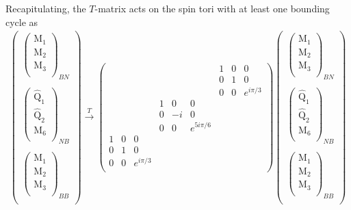 \documentclass[12pt,a4paper]{article}
\newcounter{arrow}
\begin{document}
Recapitulating, the $T$-matrix acts on the spin tori with at least one bounding cycle as 
\begin{align}
\left(\begin{matrix}
\left( \begin{matrix}
\text{M}_1\\
\text{M}_2\\
\text{M}_3\\
\end{matrix} \right)_{BN} \\
\\
\left( \begin{matrix}
\widehat{\text{Q}}_1\\
\widehat{\text{Q}}_2\\
\text{M}_6\\
\end{matrix} \right)_{NB}\\
\\
\left( \begin{matrix}
\text{M}_1\\
\text{M}_2\\
\text{M}_3\\
\end{matrix} \right)_{BB} \\
\end{matrix} \right)
\xrightarrow{T} \left( \begin{matrix}
&&&			&&&			1&0&0	\\
&&&			&&&			0&1&0	\\
&&&			&&&			0&0&e^{i \pi/3}	\\
&&&			1&0&0&			&&	\\
&&&			0&-i&0&			&&	\\
&&&			0&0&e^{5 i \pi /6}&			&&	\\
1&0&0&			&&&			&&	\\
0&1&0&			&&&			&&	\\
0&0&e^{i \pi /3}&			&&&			&&	\\		
\end{matrix} \right)
\left(\begin{matrix}
\left( \begin{matrix}
\text{M}_1\\
\text{M}_2\\
\text{M}_3\\
\end{matrix} \right)_{BN} \\
\\
\left( \begin{matrix}
\widehat{\text{Q}}_1\\
\widehat{\text{Q}}_2\\
\text{M}_6\\
\end{matrix} \right)_{NB}\\
\\
\left( \begin{matrix}
\text{M}_1\\
\text{M}_2\\
\text{M}_3\\
\end{matrix} \right)_{BB} \\
\end{matrix} \right)
\end{align}
\end{document}
